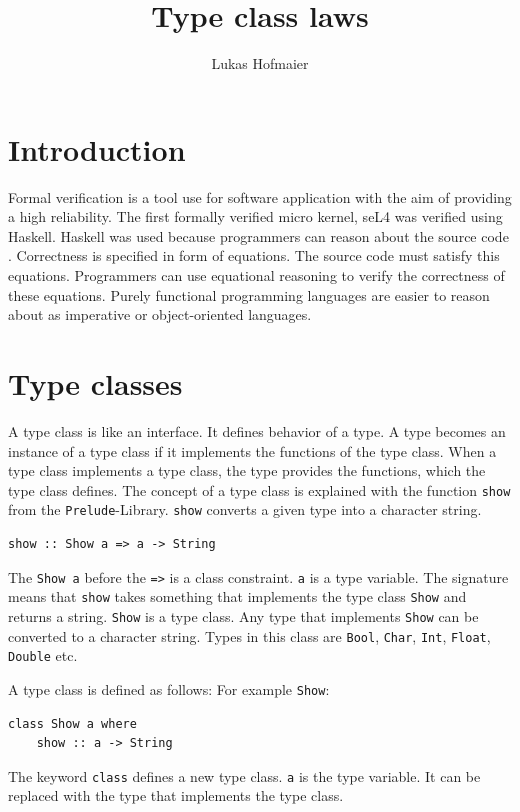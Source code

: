 \documentclass[twoside, a4paper, 12pt]{article}
\author{Lukas Hofmaier}
\title{Type class laws}
\begin{document}
\maketitle
\tableofcontents

\section{Introduction}
\label{sec:intro}

Formal verification is a tool use for software application with the aim of providing a high reliability. The first formally verified micro kernel, seL4 was verified using Haskell. Haskell was used because programmers can reason about the source code \cite{Klein09}. Correctness is specified in form of equations. The source code must satisfy this equations. Programmers can use equational reasoning to verify the correctness of these equations.
Purely functional programming languages are easier to reason about as imperative or object-oriented languages.

\section{Type classes}
\label{sec:typeclasses}

A type class is like an interface. It defines behavior of a type. A type becomes an instance of a type class if it implements the functions of the type class. When a type class implements a type class, the type provides the functions, which the type class defines.
The concept of a type class is explained with the function \verb|show| from the \verb|Prelude|-Library. \verb|show| converts a given type into a character string.
\begin{verbatim}
show :: Show a => a -> String
\end{verbatim}
The \verb|Show a| before the \verb|=>| is a class constraint. \verb|a| is a type variable. The signature means that \verb|show| takes something that implements the type class \verb|Show| and returns a string. \verb|Show| is a type class. 
Any type that implements \verb|Show| can be converted to a character string. Types in this class are \verb|Bool|, \verb|Char|, \verb|Int|, \verb|Float|, \verb|Double| etc.

A type class is defined as follows: For example \verb|Show|:
\begin{verbatim}
class Show a where
    show :: a -> String
\end{verbatim}
The keyword \verb|class| defines a new type class. \verb|a| is the type variable. It can be replaced with the type that implements the type class.
\end{document}
